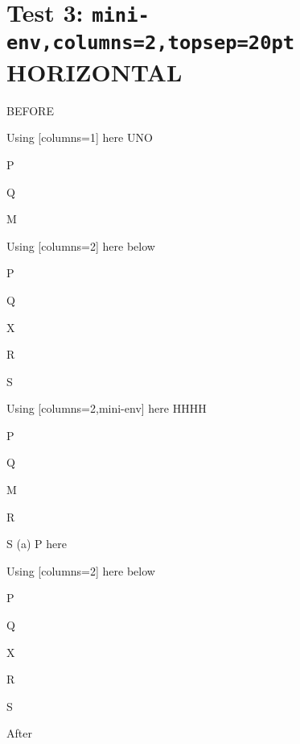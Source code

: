 \documentclass[12pt]{article}
\begin{document}
\newpage

\section{Test 3: \texttt{mini-env,columns=2,topsep=20pt} HORIZONTAL}

BEFORE
\begin{enumext}[columns=2]
\item Using [columns=1] here UNO
  \begin{enumext}[columns=1,topsep=20pt]%
     \item  P \item Q \item M %
  \end{enumext}

\item Using [columns=2] here below
\begin{enumext}[columns=2,topsep=20pt]%
     \item  P \item Q \item X  \item R \item S
  \end{enumext}

\columnbreak

\item Using [columns=2,mini-env] here HHHH
  \begin{enumext}[columns=2,mini-env={0.4\linewidth},topsep=20pt]%
    \item  P \item Q \item M \item R \item S
    \miniright
    (a) P here
  \end{enumext}

\item Using [columns=2] here below
\begin{enumext}[columns=2,topsep=20pt]%
     \item  P \item Q \item X  \item R \item S
  \end{enumext}

\end{enumext}
After
\end{document}
